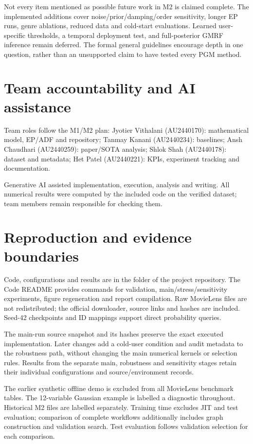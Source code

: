 Not every item mentioned as possible future work in M2 is claimed complete.
The implemented additions cover noise/prior/damping/order sensitivity, longer
EP runs, genre ablations, reduced data and cold-start evaluations. Learned
user-specific thresholds, a temporal deployment test, and full-posterior GMRF
inference remain deferred. The formal general guidelines encourage depth in
one question, rather than an unsupported claim to have tested every PGM method.

\section{Team accountability and AI assistance}
Team roles follow the M1/M2 plan: Jyotier Vithalani (AU2440170): mathematical
model, EP/ADF and repository; Tanmay Kanani (AU2440234): baselines; Ansh
Chaudhari (AU2440259): paper/SOTA analysis; Shlok Shah (AU2440178): dataset and
metadata; Het Patel (AU2440221): KPIs, experiment tracking and documentation.

Generative AI assisted implementation, execution, analysis and writing. All
numerical results were computed by the included code on the verified dataset;
team members remain responsible for checking them.

\section{Reproduction and evidence boundaries}
Code, configurations and results are in the
 folder of the project repository.
The Code README provides commands for validation, main/stress/sensitivity
experiments, figure regeneration and report compilation. Raw MovieLens files
are not redistributed; the official downloader, source links and hashes are
included. Seed-42 checkpoints and ID mappings support direct probability queries.

The main-run source snapshot and its hashes preserve the exact executed
implementation. Later changes add a cold-user condition and audit metadata to
the robustness path, without changing the main numerical kernels or selection
rules. Results from the separate main, robustness and sensitivity stages retain
their individual configurations and source/environment records.

The earlier synthetic offline demo is excluded from all MovieLens benchmark
tables. The 12-variable Gaussian example is labelled a diagnostic throughout.
Historical M2 files are labelled separately. Training time excludes JIT and
test evaluation; comparison of complete workflows additionally includes graph
construction and validation search. Test evaluation follows validation selection
for each comparison.
